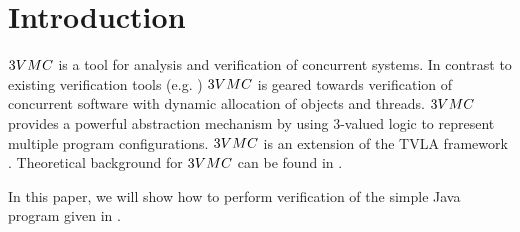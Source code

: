 \section{Introduction}

$\tvmc$ is a tool for analysis and verification of concurrent
systems. In contrast to existing verification tools (e.g.
\cite{lncs962*453}) $\tvmc$ is geared towards verification of
concurrent software with dynamic allocation of objects and
threads. $\tvmc$ provides a powerful abstraction mechanism by
using $3$-valued logic to represent multiple program
configurations. $\tvmc$ is an extension of the TVLA framework
\cite{kn:TalSAS00}. Theoretical background for $\tvmc$ can be
found in \cite{Yahav01}.



In this paper, we will show how to perform verification of the
simple Java program given in .
